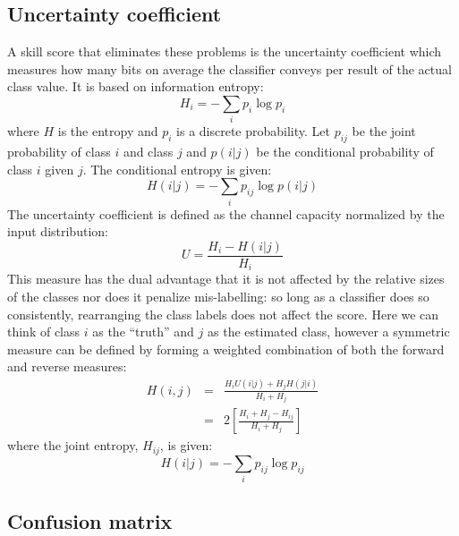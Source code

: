 \documentclass{article}
\begin{document}
\subsection{Uncertainty coefficient}

A skill score that eliminates these problems is the uncertainty coefficient
which measures how many bits on average the classifier conveys per result of the
actual class value.
It is based on information entropy:
\begin{equation}
	H_i=-\sum_i p_i \log p_i
\end{equation}
where $H$ is the entropy and $p_i$ is a discrete probability.
Let $p_{ij}$ be the joint probability of class $i$ and class $j$
and $p(i|j)$ be the conditional probability of class $i$ given $j$.
The conditional entropy is given:
\begin{equation}
	H(i|j)=-\sum_i p_{ij} \log p(i|j)
\end{equation}
The uncertainty coefficient is defined as the channel capacity normalized
by the input distribution:
\begin{equation}
	U=\frac{H_i - H(i|j)}{H_i}
\end{equation}
This measure has the dual advantage that it is not affected by the relative sizes
of the classes nor does it penalize mis-labelling: so long as a classifier
does so consistently, rearranging the class labels does not affect the 
score.
Here we can think of class $i$ as the ``truth'' and $j$ as the estimated
class, however a symmetric measure can be defined by forming a weighted 
combination of both the forward and reverse measures:
\begin{eqnarray}
	H(i,j)&=&\frac{H_i U(i|j) + H_j H(j|i)}{H_i + H_j}\\
	      &=&2\left [\frac{H_i + H_j - H_{ij}}{H_i + H_j} \right ]
\end{eqnarray}
where the joint entropy, $H_{ij}$, is given:
\begin{equation}
	H(i|j)=-\sum_i p_{ij} \log p_{ij}
\end{equation}

\subsection{Confusion matrix}
\end{document}
